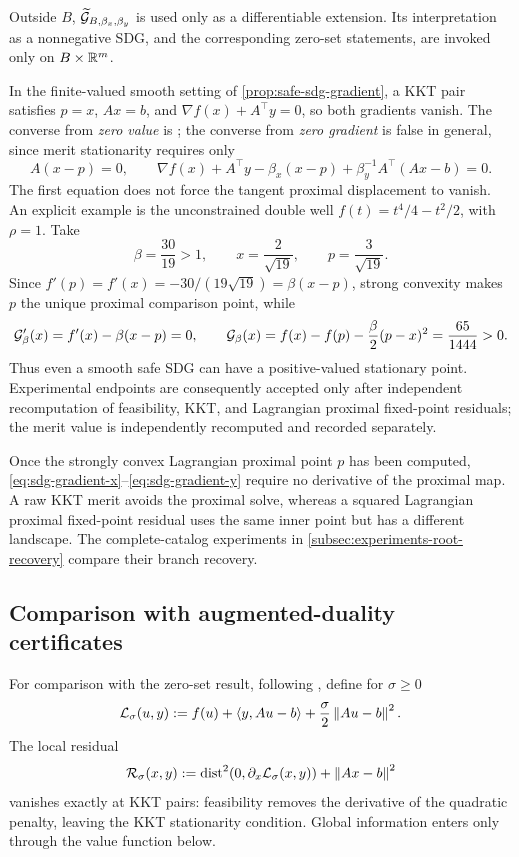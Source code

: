 Outside \(B\), \(\widetilde{\mathcal{G}}_{B,\beta_x,\beta_y}\) is used only as a
differentiable extension.  Its interpretation as a nonnegative SDG, and the
corresponding zero-set statements, are invoked only on
\(B\times\mathbb{R}^m\).

In the finite-valued smooth setting of
\cref{prop:safe-sdg-gradient}, a KKT pair satisfies \(p=x\), \(Ax=b\), and
\(\nabla f(x)+A^\top y=0\), so both gradients vanish.  The converse from
\emph{zero value} is ; the converse from
\emph{zero gradient} is false in general, since merit stationarity requires
only
\begin{equation}
  A(x-p)=0,
  \qquad
  \nabla f(x)+A^\top y-\beta_x(x-p)
  +\beta_y^{-1}A^\top(Ax-b)=0.
  \label{eq:sdg-merit-stationarity}
\end{equation}
The first equation does not force the tangent proximal displacement to
vanish.  An explicit example is the unconstrained double well
\(f(t)=t^4/4-t^2/2\), with \(\rho=1\).  Take
\[
  \beta=\frac{30}{19}>1,\qquad x=\frac2{\sqrt{19}},
  \qquad p=\frac3{\sqrt{19}}.
\]
Since \(f'(p)=f'(x)=-30/(19\sqrt{19})=\beta(x-p)\),
strong convexity makes \(p\) the unique proximal comparison point, while
\[
  \mathcal{G}_\beta'(x)=f'(x)-\beta(x-p)=0,
  \qquad
  \mathcal{G}_\beta(x)=f(x)-f(p)-\frac\beta2(p-x)^2
  =\frac{65}{1444}>0.
\]
Thus even a smooth safe SDG can have a positive-valued stationary point.
Experimental
endpoints are consequently accepted only after independent recomputation of
feasibility, KKT, and Lagrangian proximal fixed-point residuals; the merit
value is independently recomputed and recorded separately.

Once the strongly convex Lagrangian proximal point \(p\) has been computed,
\eqref{eq:sdg-gradient-x}--\eqref{eq:sdg-gradient-y} require no derivative of
the proximal map.  A raw KKT merit avoids the proximal solve, whereas a
squared Lagrangian proximal fixed-point residual uses the same inner point but
has a different landscape.  The complete-catalog experiments in
\cref{subsec:experiments-root-recovery} compare their branch recovery.

\subsection{Comparison with augmented-duality certificates}

For comparison with the zero-set result, following
\citet{Rockafellar1974}, define for \(\sigma\ge0\)
\begin{equation}
  \mathcal{L}_\sigma(u,y)
  :=
  f(u)+\left\langle y,Au-b\right\rangle+\frac \sigma2\left\lVert Au-b\right\rVert^{2}.
  \label{eq:augmented-lagrangian}
\end{equation}
The local residual
\begin{equation}
  \mathcal R_\sigma(x,y)
  :=
  \operatorname{dist}^{2}\!\left(0,\partial_x\mathcal{L}_\sigma(x,y)\right)
  +\left\lVert Ax-b\right\rVert^{2}
  \label{eq:al-kkt-residual}
\end{equation}
vanishes exactly at KKT pairs: feasibility removes the derivative of the
quadratic penalty, leaving the KKT stationarity condition.  Global information
enters only through the value function below.

